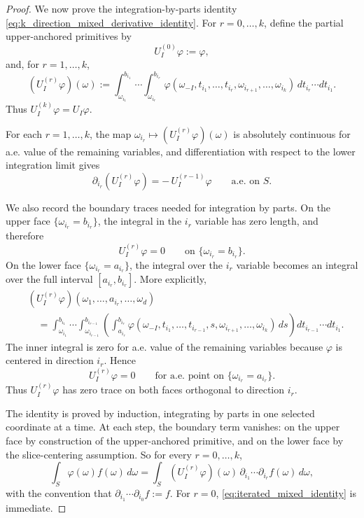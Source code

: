 \documentclass[11pt,letterpaper]{article}
\theoremstyle{definition}
\theoremstyle{remark}
\begin{document}
\begin{proof}
We now prove the integration-by-parts identity
\eqref{eq:k_direction_mixed_derivative_identity}. For $r=0,\ldots,k$, define
the partial upper-anchored primitives by
$$
U_I^{(0)}\varphi:=\varphi,
$$
and, for $r=1,\ldots,k$,
$$
(U_I^{(r)}\varphi)(\omega)
:=
\int_{\omega_{i_1}}^{b_{i_1}}
\cdots
\int_{\omega_{i_r}}^{b_{i_r}}
\varphi(\omega_{-I},t_{i_1},\ldots,t_{i_r},
\omega_{i_{r+1}},\ldots,\omega_{i_k})\,
dt_{i_r}\cdots dt_{i_1}.
$$
Thus $U_I^{(k)}\varphi=U_I\varphi$.

For each $r=1,\ldots,k$, the map
$\omega_{i_r}\mapsto (U_I^{(r)}\varphi)(\omega)$ is absolutely continuous for
a.e. value of the remaining variables, and differentiation with respect to the
lower integration limit gives
\begin{equation}
\label{eq:partial_primitive_derivative_mixed}
\partial_{i_r}(U_I^{(r)}\varphi)
=
-\,U_I^{(r-1)}\varphi
\qquad\text{a.e. on }S.
\end{equation}

We also record the boundary traces needed for integration by parts. On the
upper face $\{\omega_{i_r}=b_{i_r}\}$, the integral in the $i_r$ variable has
zero length, and therefore
$$
U_I^{(r)}\varphi=0
\qquad\text{on }\{\omega_{i_r}=b_{i_r}\}.
$$
On the lower face $\{\omega_{i_r}=a_{i_r}\}$, the integral over the $i_r$
variable becomes an integral over the full interval $[a_{i_r},b_{i_r}]$.
More explicitly,
$$
\begin{aligned}
&(U_I^{(r)}\varphi)(\omega_1,\ldots,a_{i_r},\ldots,\omega_d)
\\
&\quad =
\int_{\omega_{i_1}}^{b_{i_1}}
\cdots
\int_{\omega_{i_{r-1}}}^{b_{i_{r-1}}}
\left(
\int_{a_{i_r}}^{b_{i_r}}
\varphi(\omega_{-I},t_{i_1},\ldots,t_{i_{r-1}},s,
\omega_{i_{r+1}},\ldots,\omega_{i_k})\,ds
\right)
dt_{i_{r-1}}\cdots dt_{i_1}.
\end{aligned}
$$
The inner integral is zero for a.e. value of the remaining variables because
$\varphi$ is centered in direction $i_r$. Hence
\begin{equation}
\label{eq:partial_primitive_boundary_zero}
U_I^{(r)}\varphi=0
\qquad\text{for a.e. point on }\{\omega_{i_r}=a_{i_r}\}.
\end{equation}
Thus $U_I^{(r)}\varphi$ has zero trace on both faces orthogonal to direction
$i_r$.

The identity is proved by induction, integrating by parts in one selected
coordinate at a time. At each step, the boundary term vanishes: on the upper
face by construction of the upper-anchored primitive, and on the lower face by
the slice-centering assumption. So for every $r=0,\ldots,k$,
\begin{equation}
\label{eq:iterated_mixed_identity}
\int_S\varphi(\omega)f(\omega)\,d\omega
=
\int_S
(U_I^{(r)}\varphi)(\omega)\,
\partial_{i_1}\cdots\partial_{i_r}f(\omega)\,d\omega,
\end{equation}
with the convention that $\partial_{i_1}\cdots\partial_{i_0}f:=f$. For
$r=0$, \eqref{eq:iterated_mixed_identity} is immediate.


\end{proof}
\end{document}
